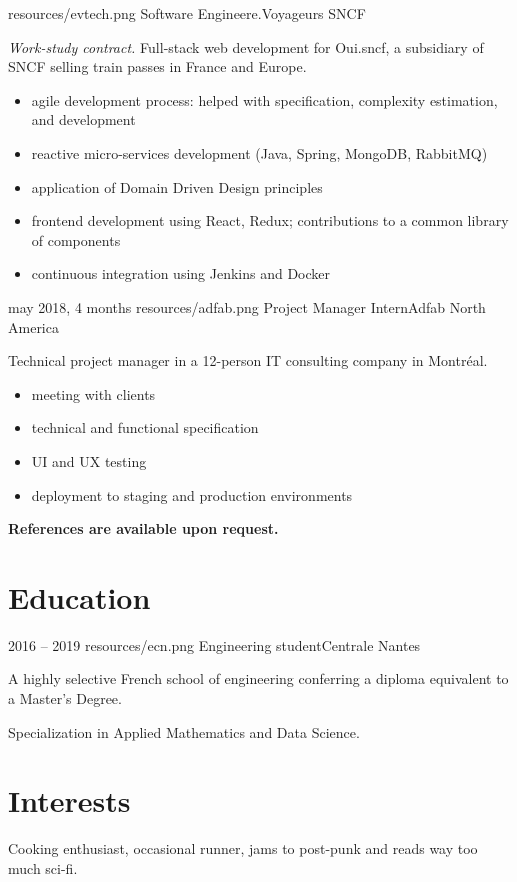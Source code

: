 \documentclass{cv}
\begin{document}
{resources/evtech.png}
{Software Engineer}{e.Voyageurs SNCF}{

\textit{Work-study contract.} Full-stack web development for Oui.sncf, a subsidiary of SNCF selling train passes in France and Europe. 

\begin{itemize}
	\item agile development process: helped with specification, complexity estimation, and development
	\item reactive micro-services development (Java, Spring, MongoDB, RabbitMQ)
	\item application of Domain Driven Design principles
	\item frontend development using React, Redux; contributions to a common library of components
	\item continuous integration using Jenkins and Docker
\end{itemize}
}

\experience
{{may 2018,  4 months}}
{resources/adfab.png}
{Project Manager Intern}{Adfab North America}{

Technical project manager in a 12-person IT consulting company in Montréal.

\begin{itemize}
	\item meeting with clients
	\item technical and functional specification
	\item UI and UX testing
	\item deployment to staging and production environments
\end{itemize}
}

\begin{center}
	\bfseries References are available upon request.
\end{center}


\pagestyle{withheader}

\section{Education}

\experience
{{2016 -- 2019}}
{resources/ecn.png}
{Engineering student}{Centrale Nantes}{

A highly selective French school of engineering conferring a diploma equivalent to a Master’s Degree. 

Specialization in Applied Mathematics and Data Science.
}

	
\section{Interests}
	
Cooking enthusiast, occasional runner, jams to post-punk and reads way too much sci-fi. 
\end{document}
